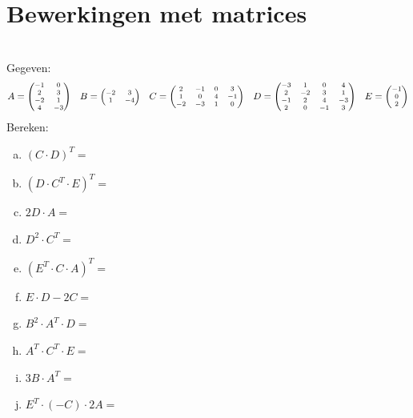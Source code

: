 \documentclass[12pt,twoside]{article}
\begin{document}
\pagebreak
\section{Bewerkingen met matrices}

\begin{oefening}\\
Gegeven:
$$
\scriptsize
A=\begin{pmatrix}
  -1 & 0\\
  2 & 3\\
  -2 & 1\\
  4 & -3
\end{pmatrix}
\quad
B=\begin{pmatrix}
  -2 & 3\\
  1 & -4\\
\end{pmatrix}
\quad
C=\begin{pmatrix}
  2 & -1 & 0 & 3\\
  1 & 0 & 4 & -1\\
  -2 & -3 & 1 & 0\\
\end{pmatrix}
\quad
D=\begin{pmatrix}
  -3 & 1 & 0 & 4\\
  2 & -2 & 3 & 1\\
  -1 & 2 & 4 & -3\\
  2 & 0 & -1 & 3\\
\end{pmatrix}
\quad
E=\begin{pmatrix}
  -1\\
  0\\
  2\\
\end{pmatrix}
$$
Bereken:
\begin{multicols}{2}
  \begin{enumerate}[(a)]
    \itemsep1em
    \item $(C\cdot D)^T=$
    \item $(D\cdot C^T\cdot E)^T=$
    \item $2D\cdot A=$
    \item $D^2\cdot C^T=$
    \item $(E^T\cdot C\cdot A)^T=$
    \item $E\cdot D - 2C=$
    \item $B^2\cdot A^T\cdot D=$
    \item $A^T\cdot C^T\cdot E=$
    \item $3B\cdot A^T=$
    \item $E^T\cdot(-C)\cdot 2A=$
  \end{enumerate}
\end{multicols}
\end{oefening}
\end{document}
